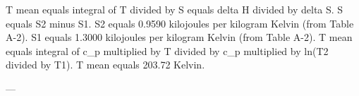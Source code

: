 T mean equals integral of T divided by S equals delta H divided by delta S.  
S equals S2 minus S1.  
S2 equals 0.9590 kilojoules per kilogram Kelvin (from Table A-2).  
S1 equals 1.3000 kilojoules per kilogram Kelvin (from Table A-2).  
T mean equals integral of c_p multiplied by T divided by c_p multiplied by ln(T2 divided by T1).  
T mean equals 203.72 Kelvin.  

---